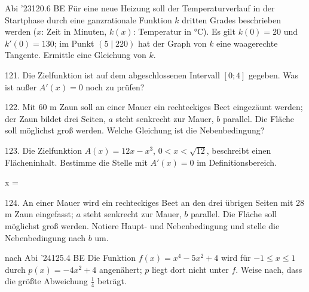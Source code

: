 \documentclass[11pt]{article}
\begin{document}
\pfgruppe{}
\begin{pfaufg}{Abi ’23}{120.}{6 BE}
Für eine neue Heizung soll der Temperaturverlauf in der Startphase durch eine ganzrationale Funktion $k$ dritten Grades beschrieben werden ($x$: Zeit in Minuten, $k(x)$: Temperatur in °C). Es gilt $k(0) = 20$ und $k'(0) = 130$; im Punkt $(5 \mid 220)$ hat der Graph von $k$ eine waagerechte Tangente. Ermittle eine Gleichung von $k$.
\end{pfaufg}
\begin{pfaufg}{}{121.}{}
Die Zielfunktion ist auf dem abgeschlossenen Intervall $[0; 4]$ gegeben. Was ist außer $A'(x) = 0$ noch zu prüfen?
\end{pfaufg}
\begin{pfaufg}{}{122.}{}
Mit 60 m Zaun soll an einer Mauer ein rechteckiges Beet eingezäunt werden; der Zaun bildet drei Seiten, $a$ steht senkrecht zur Mauer, $b$ parallel. Die Fläche soll möglichst groß werden. Welche Gleichung ist die Nebenbedingung?
\end{pfaufg}
\pfgruppe{}
\begin{pfaufg}{}{123.}{}
Die Zielfunktion $A(x) = 12x - x^3$, $0 < x < \sqrt{12}$, beschreibt einen Flächeninhalt. Bestimme die Stelle mit $A'(x) = 0$ im Definitionsbereich.
\par\noindent x = \leerfeld \par
{}
\end{pfaufg}
\begin{pfaufg}{}{124.}{}
An einer Mauer wird ein rechteckiges Beet an den drei übrigen Seiten mit $28$ m Zaun eingefasst; $a$ steht senkrecht zur Mauer, $b$ parallel. Die Fläche soll möglichst groß werden. Notiere Haupt- und Nebenbedingung und stelle die Nebenbedingung nach $b$ um.
\end{pfaufg}
\begin{pfaufg}{nach Abi ’24}{125.}{4 BE}
Die Funktion $f(x) = x^4 - 5x^2 + 4$ wird für $-1 \le x \le 1$ durch $p(x) = -4x^2 + 4$ angenähert; $p$ liegt dort nicht unter $f$. Weise nach, dass die größte Abweichung $\tfrac{1}{4}$ beträgt.
\end{pfaufg}
\end{document}
